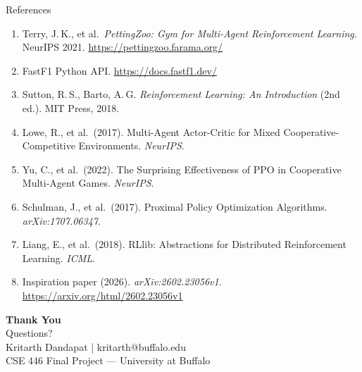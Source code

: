 \documentclass[10pt,aspectratio=169]{beamer}
\begin{document}
\begin{frame}[allowframebreaks]{References}
  \small
  \begin{enumerate}
    \item Terry, J.\,K., et al.\ \textit{PettingZoo: Gym for Multi-Agent
          Reinforcement Learning.} NeurIPS 2021.
          \url{https://pettingzoo.farama.org/}
    \item FastF1 Python API. \url{https://docs.fastf1.dev/}
    \item Sutton, R.\,S., Barto, A.\,G. \textit{Reinforcement Learning:
          An Introduction} (2nd ed.). MIT Press, 2018.
    \item Lowe, R., et al.\ (2017). Multi-Agent Actor-Critic for Mixed
          Cooperative-Competitive Environments. \textit{NeurIPS}.
    \item Yu, C., et al.\ (2022). The Surprising Effectiveness of PPO in
          Cooperative Multi-Agent Games. \textit{NeurIPS}.
    \item Schulman, J., et al.\ (2017). Proximal Policy Optimization
          Algorithms. \textit{arXiv:1707.06347}.
    \item Liang, E., et al.\ (2018). RLlib: Abstractions for Distributed
          Reinforcement Learning. \textit{ICML}.
    \item Inspiration paper (2026). \textit{arXiv:2602.23056v1}.
          \url{https://arxiv.org/html/2602.23056v1}
  \end{enumerate}
\end{frame}

{
\begin{frame}[plain]
  \vfill
  \centering
  {\huge\color{white}\textbf{Thank You}}\\[12pt]
  {\large\color{white!80} Questions?}\\[24pt]
  {\footnotesize\color{white!70}
    Kritarth Dandapat \;|\; kritarth@buffalo.edu\\
    CSE 446 Final Project --- University at Buffalo}
  \vfill
\end{frame}
}
\end{document}
